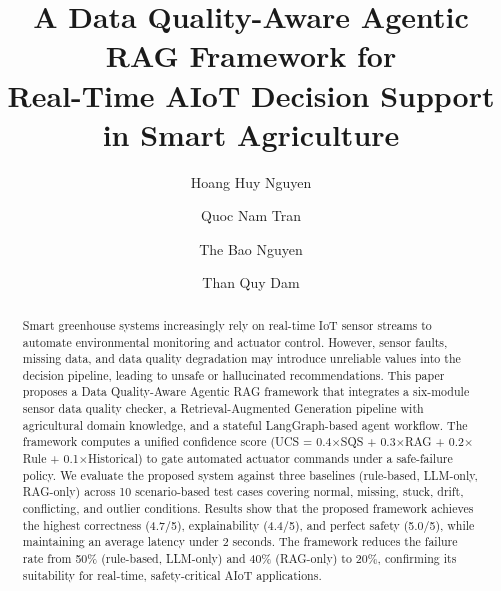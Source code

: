 \documentclass[runningheads]{llncs}
\begin{document}
\title{A Data Quality-Aware Agentic RAG Framework for\\Real-Time AIoT Decision Support in Smart Agriculture}

\author{
  Hoang Huy Nguyen \and
  Quoc Nam Tran \and
  The Bao Nguyen \and
  Than Quy Dam
}


\maketitle

\begin{abstract}
Smart greenhouse systems increasingly rely on real-time IoT sensor streams to automate environmental monitoring and actuator control. However, sensor faults, missing data, and data quality degradation may introduce unreliable values into the decision pipeline, leading to unsafe or hallucinated recommendations. This paper proposes a Data Quality-Aware Agentic RAG framework that integrates a six-module sensor data quality checker, a Retrieval-Augmented Generation pipeline with agricultural domain knowledge, and a stateful LangGraph-based agent workflow. The framework computes a unified confidence score (UCS = 0.4$\times$SQS + 0.3$\times$RAG + 0.2$\times$Rule + 0.1$\times$Historical) to gate automated actuator commands under a safe-failure policy. We evaluate the proposed system against three baselines (rule-based, LLM-only, RAG-only) across 10 scenario-based test cases covering normal, missing, stuck, drift, conflicting, and outlier conditions. Results show that the proposed framework achieves the highest correctness (4.7/5), explainability (4.4/5), and perfect safety (5.0/5), while maintaining an average latency under 2 seconds. The framework reduces the failure rate from 50\% (rule-based, LLM-only) and 40\% (RAG-only) to 20\%, confirming its suitability for real-time, safety-critical AIoT applications.

\end{abstract}
\end{document}
